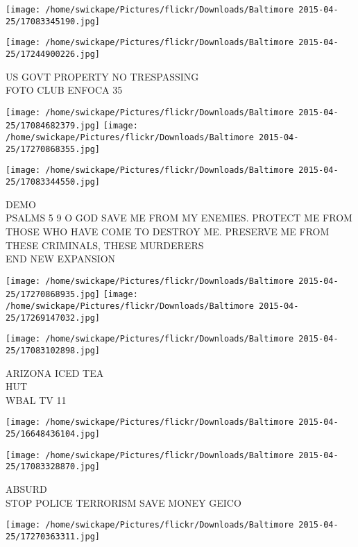 \documentclass[10pt,letterpaper]{article}
\begin{document}
\texttt{[image: /home/swickape/Pictures/flickr/Downloads/Baltimore 2015-04-25/17083345190.jpg]}

\vspace{0.25in}
\texttt{[image: /home/swickape/Pictures/flickr/Downloads/Baltimore 2015-04-25/17244900226.jpg]}

US GOVT PROPERTY NO TRESPASSING\\
FOTO CLUB ENFOCA 35\\
\pagebreak

\texttt{[image: /home/swickape/Pictures/flickr/Downloads/Baltimore 2015-04-25/17084682379.jpg]}
\texttt{[image: /home/swickape/Pictures/flickr/Downloads/Baltimore 2015-04-25/17270868355.jpg]}

\vspace{0.25in}
\texttt{[image: /home/swickape/Pictures/flickr/Downloads/Baltimore 2015-04-25/17083344550.jpg]}

DEMO\\
PSALMS 5 9 O GOD SAVE ME FROM MY ENEMIES.  PROTECT ME FROM THOSE WHO HAVE COME TO DESTROY ME.  PRESERVE ME FROM THESE CRIMINALS, THESE MURDERERS\\
END NEW EXPANSION\\
\pagebreak

\texttt{[image: /home/swickape/Pictures/flickr/Downloads/Baltimore 2015-04-25/17270868935.jpg]}
\texttt{[image: /home/swickape/Pictures/flickr/Downloads/Baltimore 2015-04-25/17269147032.jpg]}

\texttt{[image: /home/swickape/Pictures/flickr/Downloads/Baltimore 2015-04-25/17083102898.jpg]}

ARIZONA ICED TEA\\
HUT\\
WBAL TV 11\\
\pagebreak

\texttt{[image: /home/swickape/Pictures/flickr/Downloads/Baltimore 2015-04-25/16648436104.jpg]}

\vspace{0.25in}
\texttt{[image: /home/swickape/Pictures/flickr/Downloads/Baltimore 2015-04-25/17083328870.jpg]}

ABSURD\\
STOP POLICE TERRORISM SAVE MONEY GEICO\\
\pagebreak

\texttt{[image: /home/swickape/Pictures/flickr/Downloads/Baltimore 2015-04-25/17270363311.jpg]}
\end{document}
